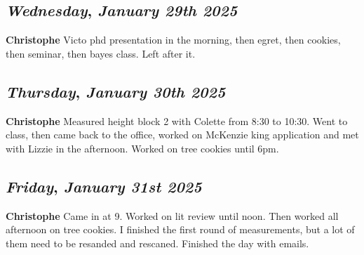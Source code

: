 \def\day{\textit{January 29th 2025}}
\def\weekday{\textit{Wednesday}}
\subsection*{\weekday, \day}
\textbf {Christophe}
Victo phd presentation in the morning, then egret, then cookies, then seminar, then bayes class. Left after it. 

\def\day{\textit{January 30th 2025}}
\def\weekday{\textit{Thursday}}
\subsection*{\weekday, \day}
\textbf {Christophe}
Measured height block 2 with Colette from 8:30 to 10:30. Went to class, then came back to the office, worked on McKenzie king application and met with Lizzie in the afternoon. Worked on tree cookies until 6pm.

\def\day{\textit{January 31st 2025}}
\def\weekday{\textit{Friday}}
\subsection*{\weekday, \day}
\textbf {Christophe}
Came in at 9. Worked on lit review until noon. Then worked all afternoon on tree cookies. I finished the first round of measurements, but a lot of them need to be resanded and rescaned. Finished the day with emails. 
